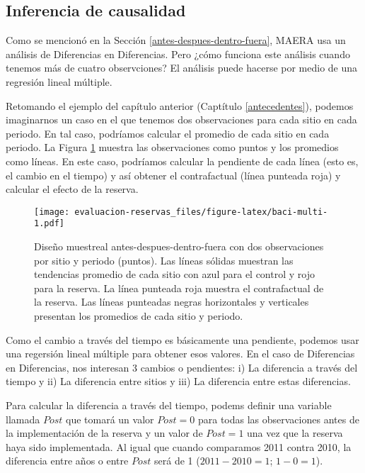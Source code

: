 \documentclass[]{krantz}
\begin{document}
\hypertarget{inferencia-de-causalidad}{%
\subsection{Inferencia de causalidad}\label{inferencia-de-causalidad}}

Como se mencionó en la Sección \ref{antes-despues-dentro-fuera}, MAERA
usa un análisis de Diferencias en Diferencias. Pero ¿cómo funciona este
análisis cuando tenemos más de cuatro observciones? El análisis puede
hacerse por medio de una regresión lineal múltiple.

Retomando el ejemplo del capítulo anterior (Captítulo
\ref{antecedentes}), podemos imaginarnos un caso en el que tenemos dos
observaciones para cada sitio en cada periodo. En tal caso, podríamos
calcular el promedio de cada sitio en cada periodo. La Figura
\ref{fig:baci-multi} muestra las observaciones como puntos y los
promedios como líneas. En este caso, podríamos calcular la pendiente de
cada línea (esto es, el cambio en el tiempo) y así obtener el
contrafactual (línea punteada roja) y calcular el efecto de la reserva.

\begin{figure}
\centering
\texttt{[image: evaluacion-reservas\_files/figure-latex/baci-multi-1.pdf]}
\caption{\label{fig:baci-multi}Diseño muestreal antes-despues-dentro-fuera
con dos observaciones por sitio y periodo (puntos). Las líneas sólidas
muestran las tendencias promedio de cada sitio con azul para el control
y rojo para la reserva. La línea punteada roja muestra el contrafactual
de la reserva. Las líneas punteadas negras horizontales y verticales
presentan los promedios de cada sitio y periodo.}
\end{figure}

Como el cambio a través del tiempo es básicamente una pendiente, podemos
usar una regersión lineal múltiple para obtener esos valores. En el caso
de Diferencias en Diferencias, nos interesan 3 cambios o pendientes: i)
La diferencia a través del tiempo y ii) La diferencia entre sitios y
iii) La diferencia entre estas diferencias.

Para calcular la diferencia a través del tiempo, podems definir una
variable llamada \(Post\) que tomará un valor \(Post = 0\) para todas
las observaciones antes de la implementación de la reserva y un valor de
\(Post = 1\) una vez que la reserva haya sido implementada. Al igual que
cuando comparamos 2011 contra 2010, la diferencia entre años o entre
\(Post\) será de 1 (\(2011 - 2010 = 1\); \(1 - 0 = 1\)).
\end{document}

